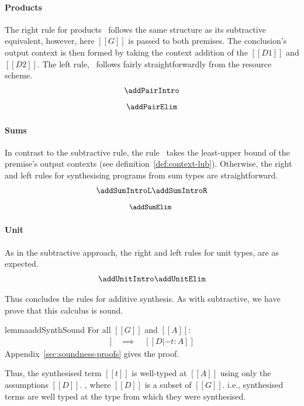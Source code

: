 \paragraph{Products}
The right rule for products \addPairIntroName\ follows the same structure as its
subtractive equivalent, however, here $[[ G ]]$ is passed to both premises.
The conclusion's output context is then formed by taking the context addition of
the $[[ D1 ]]$ and $[[ D2 ]]$. The left rule, \addPairElimName\ follows fairly
straightforwardly from the resource scheme.
\begin{align*}
\begin{array}{c}
  \addPairIntro
\\[0.8em]
  \addPairElim
\end{array}
  \end{align*}

\paragraph{Sums}
In contrast to the subtractive rule, the rule \addSumElimName\ takes the least-upper bound of
the premise's output contexts (see definition~\ref{def:context-lub}). Otherwise,
the right and left rules for synthesising programs from sum types are straightforward.
\begin{align*}
\begin{array}{c}
  \addSumIntroL
  \addSumIntroR
\\[0.8em]
{\small{\!\!\addSumElim}}
\end{array}
  \end{align*}

\paragraph{Unit}
As in the subtractive approach, the right and left rules for unit types, are
as expected.
\begin{align*}
\begin{array}{c}
  \addUnitIntro
  \addUnitElim
\end{array}
  \end{align*}


  Thus concludes the rules for additive synthesis. As with subtractive, we
  have prove that this calculus is sound.
  \begin{restatable}{lemma}{addSynthSound}
\label{lemma:addSynthSound} For all $[[ G ]]$ and $[[ A ]]$:
%
\begin{align*}
[[ G |- A =>+ t ; D ]] \quad \implies \quad [[ D |- t : A ]]
\end{align*}
Appendix~\ref{sec:soundness-proofs} gives the proof.
\end{restatable}
Thus, the synthesised term $[[ t ]]$ is well-typed
at $[[ A ]]$ using only the assumptions $[[ D ]]$.
, where $[[D]]$ is a
subset of $[[G]]$.
i.e., synthesised terms are well typed at the type from which they
were synthesised.

